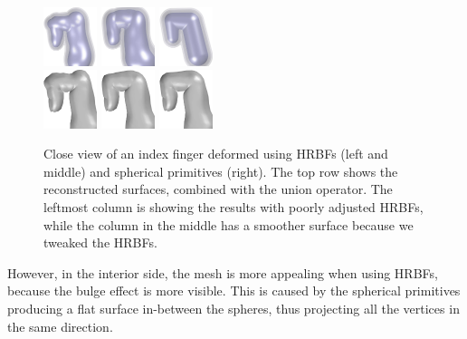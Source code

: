 \documentclass[a4paper,10pt]{article}
\begin{document}
\begin{multicols}{2}
\begin{figure}[H]
\centering
\includegraphics[width=0.14\textwidth]{figs/index_sdf_hrbf_union_bad}
\includegraphics[width=0.14\textwidth]{figs/index_sdf_hrbf_union}
\includegraphics[width=0.14\textwidth]{figs/index_sdf_sphere_union} \\
\includegraphics[width=0.14\textwidth]{figs/index_implicit_bad_hrbf}
\includegraphics[width=0.14\textwidth]{figs/index_implicit_hrbf}
\includegraphics[width=0.14\textwidth]{figs/index_implicit_spheres}
\caption{Close view of an index finger deformed using HRBFs (left and middle) and spherical primitives (right).
The top row shows the reconstructed surfaces, combined with the union operator.
The leftmost column is showing the results with poorly adjusted HRBFs, while the column in the middle has a smoother surface because we tweaked the HRBFs.}
\end{figure}

However, in the interior side, the mesh is more appealing when using HRBFs, because the bulge effect is more visible.
This is caused by the spherical primitives producing a flat surface in-between the spheres, thus projecting all the vertices in the same direction.


\end{multicols}
\end{document}
